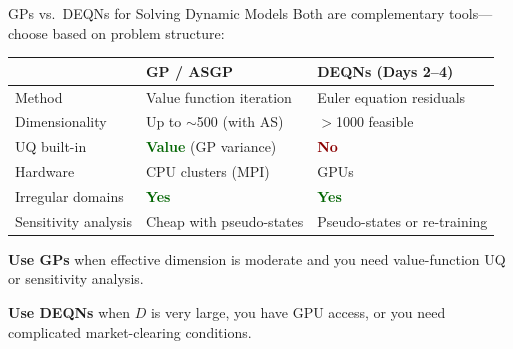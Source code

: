 \documentclass[aspectratio=169,11pt]{beamer}
\newcommand{\emphc}[1]{\textcolor{harvardcrimson}{#1}}
\begin{document}
\begin{frame}{GPs vs.\ DEQNs for Solving Dynamic Models}
Both are \emphc{complementary tools}---choose based on problem structure:

\vspace{0.3em}
\begin{center}
\scriptsize
\renewcommand{\arraystretch}{1.15}
\begin{tabular}{p{2.8cm} p{3.8cm} p{3.8cm}}
\toprule
 & \textbf{GP / ASGP} & \textbf{DEQNs (Days 2--4)} \\
\midrule
Method & Value function iteration & Euler equation residuals \\
Dimensionality & Up to $\sim$500 (with AS) & $>$1000 feasible \\
UQ built-in & \textcolor{darkgreen}{\textbf{Value}} (GP variance) & \textcolor{darkred}{\textbf{No}} \\
Hardware & CPU clusters (MPI) & GPUs \\
Irregular domains & \textcolor{darkgreen}{\textbf{Yes}} & \textcolor{darkgreen}{\textbf{Yes}} \\
Sensitivity analysis & Cheap with pseudo-states & Pseudo-states or re-training \\
\bottomrule
\end{tabular}
\end{center}

\vspace{0.3em}
\small
\textbf{Use GPs} when effective dimension is moderate and you need value-function UQ or sensitivity analysis.

\textbf{Use DEQNs} when $D$ is very large, you have GPU access, or you need complicated market-clearing conditions.
\end{frame}
\end{document}
